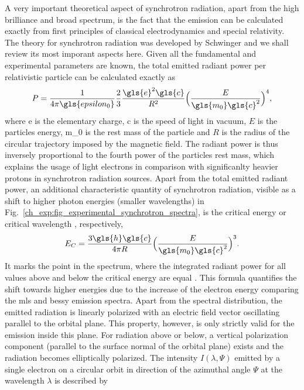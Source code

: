 A very important theoretical aspect of synchrotron radiation, apart from the high brilliance and broad spectrum, is the fact that the emission can be calculated exactly from first principles of classical electrodynamics and special relativity. The theory for synchrotron radiation was developed by Schwinger \cite{schwinger_classical_1949} and we shall review its most imporant aspects here. Given all the fundamental and experimental parameters are known, the total emitted radiant power per relativistic particle can be calculated exactly as
\begin{align}
 P = \frac{1}{4 \pi \gls{epsilon_0}} \frac{2}{3} \frac{\gls{e}^2 \gls{c}}{R^2}\Big( \frac{E}{\gls{m_0} \gls{c}^2}\Big)^4 \text{,} \label{ch_exp:schwinger_equation_total_power}
\end{align}
where \gls{e} is the elementary charge, \gls{c} is the speed of light in vacuum, $E$ is the particles energy, \gls{m_0} is the rest mass of the particle and $R$ is the radius of the circular trajectory imposed by the magnetic field. The radiant power is thus inversely proportional to the fourth power of the particles rest mass, which explains the usage of light electrons in comparison with significanlty heavier protons in synchrotron radiation sources. Apart from the total emitted radiant power, an additional characteristic quantity of synchrotron radiation, visible as a shift to higher photon energies (smaller wavelengths) in Fig.~\ref{ch_exp:fig_experimental_synchrotron_spectra}, is the critical energy or critical wavelength \cite{schwinger_classical_1949}, respectively,
\begin{align}
 E_C = \frac{3 \gls{h} \gls{c}}{4 \pi R} \Big( \frac{E}{\gls{m_0} \gls{c}^2}\Big)^3 \text{.} \label{ch_exp:characteristic_energy}
\end{align}
It marks the point in the spectrum, where the integrated radiant power for all values above and below the critical energy are equal \cite{balerna_introduction_2015}. This formula quantifies the shift towards higher energies due to the increase of the electron energy comparing the \gls{mls} and \gls{bessy} emission spectra. Apart from the spectral distribution, the emitted radiation is linearly polarized with an electric field vector oscillating parallel to the orbital plane. This property, however, is only strictly valid for the emission inside this plane. For radiation above or below, a vertical polarization component (parallel to the surface normal of the orbital plane) exists and the radiation becomes elliptically polarized. The intensity $I(\lambda,\Psi)$ emitted by a single electron on a circular orbit in direction of the azimuthal angle $\Psi$ at the wavelength $\lambda$ is described by

